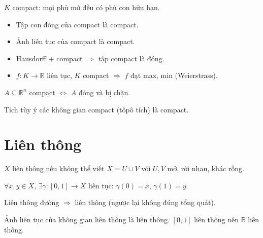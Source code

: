 \documentclass[12pt,a4paper]{article}
\begin{document}
\begin{dinhnghia}[title={Compact}]
  $K$ compact: mọi phủ mở đều có phủ con hữu hạn.
\end{dinhnghia}

\begin{dinhly}[title={Tính chất}]
  \begin{itemize}
    \item Tập con đóng của compact là compact.
    \item Ảnh liên tục của compact là compact.
    \item Hausdorff + compact $\Rightarrow$ tập compact là đóng.
    \item $f: K \to \mathbb{R}$ liên tục, $K$ compact $\Rightarrow$ $f$ đạt max, min (Weierstrass).
  \end{itemize}
\end{dinhly}

\begin{dinhly}[title={Heine--Borel}]
  $A \subseteq \mathbb{R}^n$ compact $\Leftrightarrow$ $A$ đóng và bị chặn.
\end{dinhly}

\begin{dinhly}[title={Tychonoff}]
  Tích tùy ý các không gian compact (tôpô tích) là compact.
\end{dinhly}

\section{Liên thông}

\begin{dinhnghia}[title={Liên thông}]
  $X$ liên thông nếu không thể viết $X = U \cup V$ với $U, V$ mở, rời nhau, khác rỗng.
\end{dinhnghia}

\begin{dinhnghia}[title={Liên thông đường (path-connected)}]
  $\forall x, y \in X$, $\exists \gamma: [0,1] \to X$ liên tục: $\gamma(0) = x$, $\gamma(1) = y$.

  Liên thông đường $\Rightarrow$ liên thông (ngược lại không đúng tổng quát).
\end{dinhnghia}

\begin{dinhly}
  Ảnh liên tục của không gian liên thông là liên thông. $[0,1]$ liên thông nên $\mathbb{R}$ liên thông.
\end{dinhly}
\end{document}
